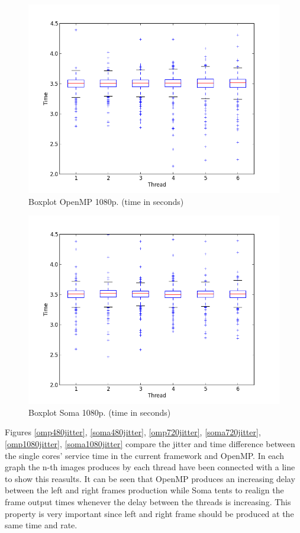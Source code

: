 \documentclass[a4paper,12pt,oneside]{book}
\begin{document}
\begin{figure}[H]
\centering
\includegraphics[scale=0.55]{omp_time_1080txtbox.png}
\caption{Boxplot OpenMP 1080p. (time in seconds)}
\label{box1080omp}
\end{figure}

\begin{figure}[H]
\centering
\includegraphics[scale=0.55]{soma_time_1080txtbox.png}
\caption{Boxplot Soma 1080p. (time in seconds)}
\label{box1080soma}
\end{figure}


Figures \ref{omp480jitter}, \ref{soma480jitter}, \ref{omp720jitter}, \ref{soma720jitter}, \ref{omp1080jitter}, \ref{soma1080jitter} compare the jitter and time difference between the single cores' service time in the current framework and OpenMP. In each graph the n-th images produces by each thread have been connected with a line to show this reasults. It can be seen that OpenMP produces an increasing delay between the left and right frames production while Soma tents to realign the frame output times whenever the delay between the threads is increasing. This property is very important since left and right frame should be produced at the same time and rate.
\end{document}
